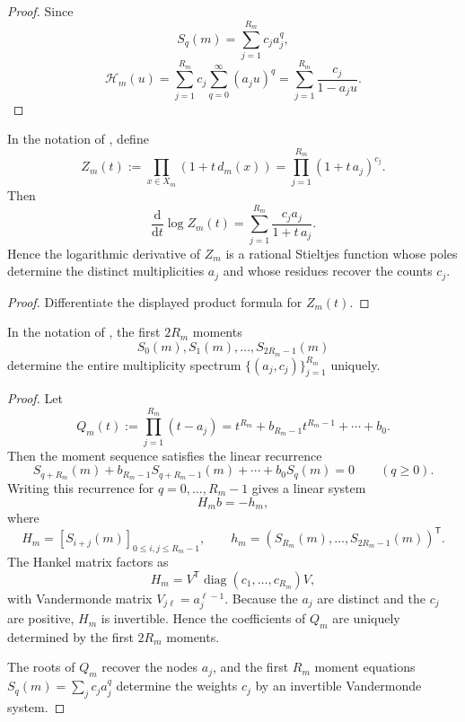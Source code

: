 \begin{proof}
Since
\[
  S_q(m)=\sum_{j=1}^{R_m} c_j a_j^q,
\]
\[
  \mathcal H_m(u)
  =
  \sum_{j=1}^{R_m} c_j \sum_{q=0}^{\infty}(a_ju)^q
  =
  \sum_{j=1}^{R_m}\frac{c_j}{1-a_ju}.
\]
\end{proof}

\begin{corollary}
\label{cor:stieltjes-log-derivative}
In the notation of , define
\[
  Z_m(t):=\prod_{x\in X_m}(1+t\,d_m(x))
  =\prod_{j=1}^{R_m}(1+t\,a_j)^{c_j}.
\]
Then
\[
  \frac{\mathrm{d}}{\mathrm{d}t}\log Z_m(t)
  =
  \sum_{j=1}^{R_m}\frac{c_j a_j}{1+t\,a_j}.
\]
Hence the logarithmic derivative of \(Z_m\) is a rational Stieltjes function
whose poles determine the distinct multiplicities \(a_j\) and whose residues
recover the counts \(c_j\).
\end{corollary}

\begin{proof}
Differentiate the displayed product formula for \(Z_m(t)\).
\end{proof}

\begin{theorem}
\label{thm:fiber-reconstruction}
In the notation of , the first \(2R_m\) moments
\[
  S_0(m),S_1(m),\dots,S_{2R_m-1}(m)
\]
determine the entire multiplicity spectrum
\(\{(a_j,c_j)\}_{j=1}^{R_m}\) uniquely.
\end{theorem}

\begin{proof}
Let
\[
  Q_m(t):=\prod_{j=1}^{R_m}(t-a_j)
  =t^{R_m}+b_{R_m-1}t^{R_m-1}+\cdots+b_0.
\]
Then the moment sequence satisfies the linear recurrence
\[
  S_{q+R_m}(m)+b_{R_m-1}S_{q+R_m-1}(m)+\cdots+b_0S_q(m)=0
  \qquad (q\ge 0).
\]
Writing this recurrence for \(q=0,\dots,R_m-1\) gives a linear system
\[
  H_m b=-h_m,
\]
where
\[
  H_m=[S_{i+j}(m)]_{0\le i,j\le R_m-1},
  \qquad
  h_m=(S_{R_m}(m),\dots,S_{2R_m-1}(m))^{\mathsf T}.
\]
The Hankel matrix factors as
\[
  H_m=V^{\mathsf T}\operatorname{diag}(c_1,\dots,c_{R_m})V,
\]
with Vandermonde matrix \(V_{j\ell}=a_j^{\ell-1}\).  Because the \(a_j\) are
distinct and the \(c_j\) are positive, \(H_m\) is invertible.  Hence the
coefficients of \(Q_m\) are uniquely determined by the first \(2R_m\) moments.

The roots of \(Q_m\) recover the nodes \(a_j\), and the first \(R_m\) moment
equations \(S_q(m)=\sum_j c_j a_j^q\) determine the weights \(c_j\) by an
invertible Vandermonde system.
\end{proof}

